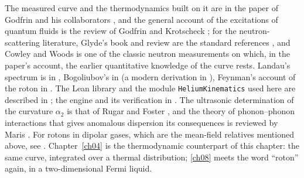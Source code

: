 The measured curve and the thermodynamics built on it are in the paper of Godfrin and his collaborators \cite{Godfrin2021}, and the general account of the excitations of quantum fluids is the review of Godfrin and Krotscheck \cite{GodfrinKrotscheck2022}; for the neutron-scattering literature, Glyde's book and review are the standard references \cite{Glyde1994,Glyde2017}, and Cowley and Woods \cite{CowleyWoods1971} is one of the classic neutron measurements on which, in the paper's account, the earlier quantitative knowledge of the curve rests.
Landau's spectrum is in \cite{Landau1941,Landau1947}, Bogoliubov's in \cite{Bogoliubov1947} (a modern derivation in \cite{Dalfovo1999,PitaevskiiStringari2016}), Feynman's account of the roton in \cite{Feynman1954,FeynmanCohen1956}.
The Lean library and the module \texttt{HeliumKinematics} used here are described in \cite{Callens2026lib}; the engine and its verification in \cite{Callens2026sw}.
The ultrasonic determination of the curvature $\alpha_2$ is that of Rugar and Foster \cite{RugarFoster1984}, and the theory of phonon--phonon interactions that gives anomalous dispersion its consequences is reviewed by Maris \cite{Maris1977}.
For rotons in dipolar gases, which are the mean-field relatives mentioned above, see \cite{Santos2003,Chomaz2018}.
Chapter~\ref{ch04} is the thermodynamic counterpart of this chapter: the same curve, integrated over a thermal distribution; \cref{ch08} meets the word ``roton'' again, in a two-dimensional Fermi liquid.
